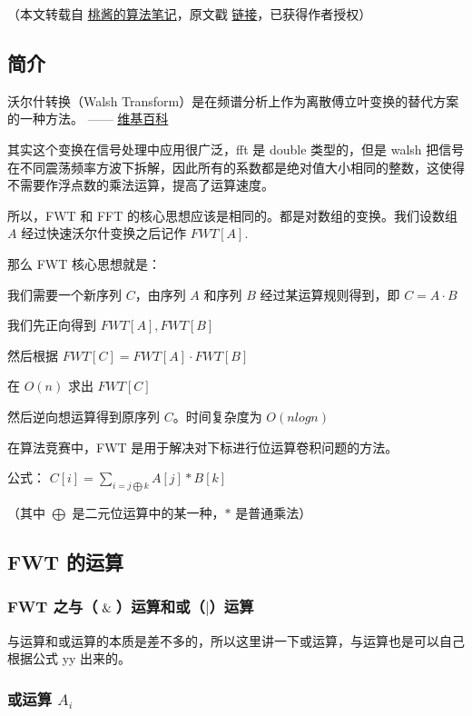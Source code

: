 
（本文转载自 \href{https://zhuanlan.zhihu.com/c_1005817911142838272}{桃酱的算法笔记}，原文戳 \href{https://zhuanlan.zhihu.com/p/41867199}{链接}，已获得作者授权）

\subsection{简介}

\begin{QUOTE}{}{}
沃尔什转换（Walsh Transform）是在频谱分析上作为离散傅立叶变换的替代方案的一种方法。 —— \href{https://zh.wikipedia.org/zh-cn/\%E6%B2%83%E7%88%BE%E4%BB%80%E8%BD%89%E6%8F%9B}{维基百科}
\end{QUOTE}

其实这个变换在信号处理中应用很广泛，fft 是 double 类型的，但是 walsh 把信号在不同震荡频率方波下拆解，因此所有的系数都是绝对值大小相同的整数，这使得不需要作浮点数的乘法运算，提高了运算速度。

所以，FWT 和 FFT 的核心思想应该是相同的。都是对数组的变换。我们设数组 $A$ 经过快速沃尔什变换之后记作 $FWT[A]$.

那么 FWT 核心思想就是：

我们需要一个新序列 $C$，由序列 $A$ 和序列 $B$ 经过某运算规则得到，即 $C = A \cdot B$

我们先正向得到 $FWT[A], FWT[B]$

然后根据 $FWT[C]=FWT[A] \cdot FWT[B]$

在 $O(n)$ 求出 $FWT[C]$

然后逆向想运算得到原序列 $C$。时间复杂度为 $O(nlogn)$

在算法竞赛中，FWT 是用于解决对下标进行位运算卷积问题的方法。

公式： $C[i] = \sum_{i=j \bigoplus k}A[j] * B[k]$

（其中 $\bigoplus$ 是二元位运算中的某一种，$*$ 是普通乘法）

\subsection{FWT 的运算}

\subsubsection{FWT 之与（$\And$）运算和或（$|$）运算}

与运算和或运算的本质是差不多的，所以这里讲一下或运算，与运算也是可以自己根据公式 yy 出来的。

\subsubsection{或运算 $A_i$}

